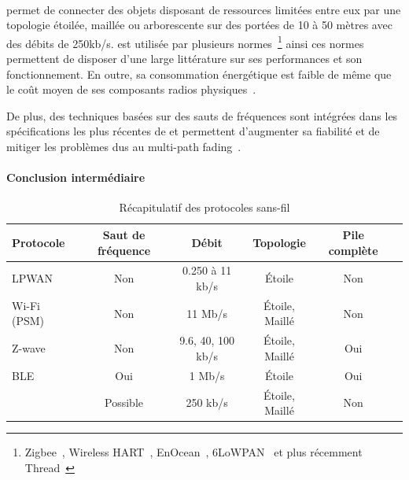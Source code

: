 \paragraph{\ieee{}}

\ieee{} permet de connecter des objets disposant de ressources limitées entre eux par une topologie étoilée, maillée ou arborescente sur des portées de 10 à 50 mètres avec des débits de 250kb/s.
\ieee{} est utilisée par plusieurs normes~\footnote{Zigbee~\cite{alliance2006zigbee, zigbeeCritic}, Wireless HART~\cite{lennvall2008comparison}, EnOcean~\cite{ploennigs2010performance}, \ac{6LoWPAN}~\cite{shelby20116lowpan} et plus récemment Thread~\cite{threadCritic}} ainsi ces normes permettent de disposer d'une large littérature sur ses performances et son fonctionnement.
En outre, sa consommation énergétique est faible de même que le coût moyen de ses composants radios physiques~\cite{vilajosana2015openmote}.

De plus, des techniques basées sur des sauts de fréquences sont intégrées dans les spécifications les plus récentes de \ieee{} et permettent d'augmenter sa fiabilité et de mitiger les problèmes dus au multi-path fading~\cite{6tisch}.

\paragraph{Conclusion intermédiaire}

\begin{table}[t]
\centering
\begin{tabular}{|l|c|c|c|c|c|}
\hline
Protocole & Saut de fréquence & Débit & Topologie & Pile complète \\
\hline
LPWAN & Non & 0.250 à 11 kb/s & Étoile & Non \\
\hline
Wi-Fi (PSM) & Non & 11 Mb/s & Étoile, Maillé & Non \\
\hline
Z-wave & Non & 9.6, 40, 100 kb/s & Étoile, Maillé &  Oui \\
\hline
\ac{BLE} & Oui & 1 Mb/s & Étoile & Oui \\
\hline
\ieee{} & Possible & 250 kb/s & Étoile, Maillé & Non \\
\hline
\end{tabular}
\caption{Récapitulatif des protocoles sans-fil}

\label{gw:table:protocol_recap}
\end{table}

